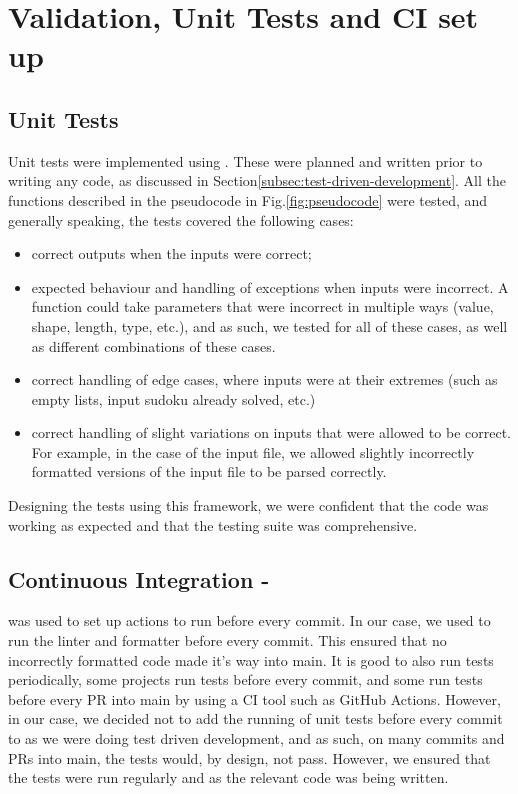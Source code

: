 
\section{Validation, Unit Tests and CI set up}\label{sec:validation-unit-tests-and-ci-set-up}
    \subsection{Unit Tests}\label{subsec:validation}
    Unit tests were implemented using .
    These were planned and written prior to writing any code, as discussed in Section\eqref{subsec:test-driven-development}.
    All the functions described in the pseudocode in Fig.\eqref{fig:pseudocode} were tested, and generally speaking, the
    tests covered the following cases:
    \begin{itemize}
        \item correct outputs when the inputs were correct;
        \item expected behaviour and handling of exceptions when inputs were incorrect.
        A function could take parameters that were incorrect in multiple ways (value, shape, length, type, etc.), and as such,
        we tested for all of these cases, as well as different combinations of these cases.
        \item correct handling of edge cases, where inputs were at their extremes (such as empty lists, input
        sudoku already solved, etc.)
        \item correct handling of slight variations on inputs that were allowed to be correct.
        For example, in the case of the input file, we allowed slightly incorrectly formatted versions of the input file
        to be parsed correctly.
    \end{itemize}

    Designing the tests using this framework, we were confident that the code was working as expected and that the testing
    suite was comprehensive.

    \subsection{Continuous Integration - }\label{subsec:continuous-integration}
     was used to set up actions to run before every commit.
    In our case, we used  to run the  linter and formatter before every commit.
    This ensured that no incorrectly formatted code made it's way into main.
    It is good to also run tests periodically, some projects run tests before every commit, and some run tests before
    every PR into main by using a CI tool such as GitHub Actions.
    However, in our case, we decided not to add the running of unit tests before every commit to
     as we were doing test driven development, and as such, on many commits
    and PRs into main, the tests would, by design, not pass.
    However, we ensured that the tests were run regularly and as the relevant code was being written.
